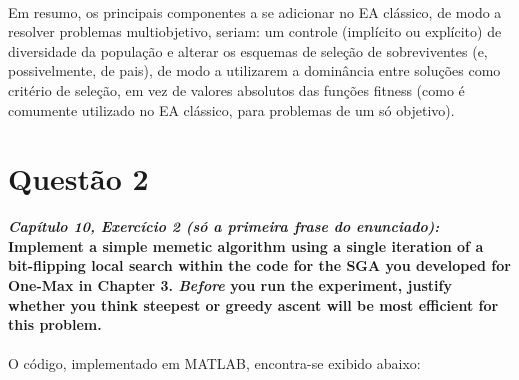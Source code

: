 \documentclass{report}
\begin{document}
\paragraph{} Em resumo, os principais componentes a se adicionar no EA clássico, de modo a resolver problemas multiobjetivo, seriam: um controle (implícito ou explícito) de diversidade da população e alterar os esquemas de seleção de sobreviventes (e, possivelmente, de pais), de modo a utilizarem a dominância entre soluções como critério de seleção, em vez de valores absolutos das funções fitness (como é comumente utilizado no EA clássico, para problemas de um só objetivo).\\

\section*{Questão 2}

\textbf{\textit{Capítulo 10, Exercício 2 (só a primeira frase do enunciado):}}\\

\textbf{Implement a simple memetic algorithm using a single iteration of a bit-flipping local search within the code for the SGA you developed for One-Max in Chapter 3. \textit{Before} you run the experiment, justify whether you think steepest or greedy ascent will be most efficient for this problem.}\\

\paragraph{} O código, implementado em MATLAB, encontra-se exibido abaixo:\\
\end{document}
